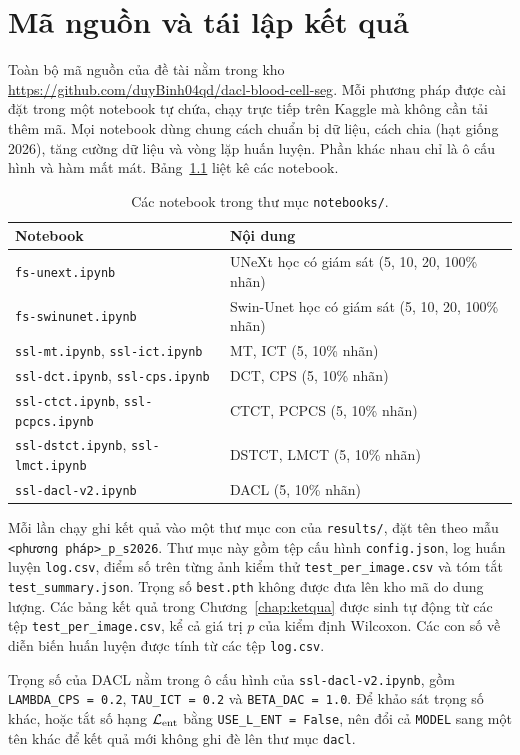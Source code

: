 \chapter{Mã nguồn và tái lập kết quả}
\label{app:code}

Toàn bộ mã nguồn của đề tài nằm trong kho \url{https://github.com/duyBinh04qd/dacl-blood-cell-seg}. Mỗi phương pháp được cài đặt trong một notebook tự chứa, chạy trực tiếp trên Kaggle mà không cần tải thêm mã. Mọi notebook dùng chung cách chuẩn bị dữ liệu, cách chia (hạt giống 2026), tăng cường dữ liệu và vòng lặp huấn luyện. Phần khác nhau chỉ là ô cấu hình và hàm mất mát. Bảng~\ref{tab:notebooks} liệt kê các notebook.

\begin{table}[ht]
\centering
\caption{Các notebook trong thư mục \texttt{notebooks/}.}
\label{tab:notebooks}
\small
\begin{tabular}{ll}
\toprule
Notebook & Nội dung \\
\midrule
\texttt{fs-unext.ipynb}    & UNeXt học có giám sát (5, 10, 20, 100\% nhãn) \\
\texttt{fs-swinunet.ipynb} & Swin-Unet học có giám sát (5, 10, 20, 100\% nhãn) \\
\texttt{ssl-mt.ipynb}, \texttt{ssl-ict.ipynb} & MT, ICT (5, 10\% nhãn) \\
\texttt{ssl-dct.ipynb}, \texttt{ssl-cps.ipynb} & DCT, CPS (5, 10\% nhãn) \\
\texttt{ssl-ctct.ipynb}, \texttt{ssl-pcpcs.ipynb} & CTCT, PCPCS (5, 10\% nhãn) \\
\texttt{ssl-dstct.ipynb}, \texttt{ssl-lmct.ipynb} & DSTCT, LMCT (5, 10\% nhãn) \\
\texttt{ssl-dacl-v2.ipynb} & DACL (5, 10\% nhãn) \\
\bottomrule
\end{tabular}
\end{table}

Mỗi lần chạy ghi kết quả vào một thư mục con của \texttt{results/}, đặt tên theo mẫu \texttt{<phương pháp>\_<tỷ lệ>p\_s2026}. Thư mục này gồm tệp cấu hình \texttt{config.json}, log huấn luyện \texttt{log.csv}, điểm số trên từng ảnh kiểm thử \texttt{test\_per\_image.csv} và tóm tắt \texttt{test\_summary.json}. Trọng số \texttt{best.pth} không được đưa lên kho mã do dung lượng. Các bảng kết quả trong Chương~\ref{chap:ketqua} được sinh tự động từ các tệp \texttt{test\_per\_image.csv}, kể cả giá trị $p$ của kiểm định Wilcoxon. Các con số về diễn biến huấn luyện được tính từ các tệp \texttt{log.csv}.

Trọng số của DACL nằm trong ô cấu hình của \texttt{ssl-dacl-v2.ipynb}, gồm \texttt{LAMBDA\_CPS = 0.2}, \texttt{TAU\_ICT = 0.2} và \texttt{BETA\_DAC = 1.0}. Để khảo sát trọng số khác, hoặc tắt số hạng $\mathcal{L}_{\mathrm{ent}}$ bằng \texttt{USE\_L\_ENT = False}, nên đổi cả \texttt{MODEL} sang một tên khác để kết quả mới không ghi đè lên thư mục \texttt{dacl}.

